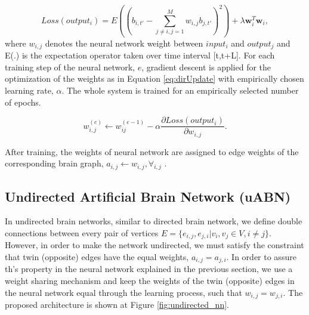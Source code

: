 \documentclass[runningheads]{llncs}
\begin{document}
\begin{equation}
Loss(output_i) = E (( b_{i,t'} - \sum_{j\neq i,j=1}^{M} w_{i,j} b_{j,t'} )^2) + \lambda  \mathbf{w}^{T}_{i} \mathbf{w}_{i} 
\label{eq:dir_loss} ,
\end{equation}
where $w_{i,j}$ denotes the neural network weight between $input_i$ and $output_j$ and E(.) is the expectation operator taken over time interval [t,t+L]. For each training step of the neural network, $e$, gradient descent is applied for the optimization of the weights as in Equation \eqref{eq:dirUpdate} with empirically chosen learning rate, $\alpha$. The whole system is trained for an empirically selected number of epochs.

\begin{equation}
w_{i,j}^{(e)} \leftarrow w_{ij}^{(e-1)} - \alpha \frac{\partial Loss(output_i)}{\partial w_{i,j}} .
\label{eq:dirUpdate} 
\end{equation}

After training, the weights of neural network are assigned to edge weights of the corresponding brain graph, $ a_{i,j} \gets w_{i,j}, \forall_{i,j}$ .


\subsection{Undirected Artificial Brain Network (uABN)}

In undirected brain networks, similar to directed brain network, we define double connections between every pair of vertices $E = \{ e_{i,j}, e_{j,i}| v_i,v_j \in V, i \neq j \}$.  However, in order to make the network undirected, we must satisfy the constraint that twin (opposite) edges have the equal weights, $a_{i,j} = a_{j,i}$. In order to assure th's property in the neural network explained in the previous section, we use a weight sharing mechanism and keep the weights of the twin (opposite) edges in the neural network equal through the learning process, such that $w_{i,j} = w_{j,i}$. The proposed architecture is shown at Figure \ref{fig:undirected_nn}.
\end{document}
